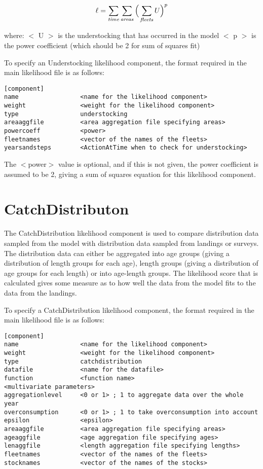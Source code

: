 \documentclass [a4paper, 10pt]{book}
\begin{document}
\begin{equation}\label{eq:understocking}
\ell = \sum_{\it time}\sum_{\it areas} \Big(\sum_{\it fleets} U \Big)^p
\end{equation}

where:\newline
$<$ U $>$ is the understocking that has occurred in the model\newline
$<$ p $>$ is the power coefficient (which should be 2 for sum of squares fit)

\bigskip
To specify an Understocking likelihood component, the format required in the main likelihood file is as follows:

{\small\begin{verbatim}
[component]
name                 <name for the likelihood component>
weight               <weight for the likelihood component>
type                 understocking
areaaggfile          <area aggregation file specifying areas>
powercoeff           <power>
fleetnames           <vector of the names of the fleets>
yearsandsteps        <ActionAtTime when to check for understocking>
\end{verbatim}}

The $<$power$>$ value is optional, and if this is not given, the power coefficient is assumed to be 2, giving a sum of squares equation for this likelihood component.

\section{CatchDistributon}\label{sec:catchdist}
The CatchDistribution likelihood component is used to compare distribution data sampled from the model with distribution data sampled from landings or surveys.  The distribution data can either be aggregated into age groups (giving a distribution of length groups for each age), length groups (giving a distribution of age groups for each length) or into age-length groups.  The likelihood score that is calculated gives some measure as to how well the data from the model fits to the data from the landings.

\bigskip
To specify a CatchDistribution likelihood component, the format required in the main likelihood file is as follows:

{\small\begin{verbatim}
[component]
name                 <name for the likelihood component>
weight               <weight for the likelihood component>
type                 catchdistribution
datafile             <name for the datafile>
function             <function name>
<multivariate parameters>
aggregationlevel     <0 or 1> ; 1 to aggregate data over the whole year
overconsumption      <0 or 1> ; 1 to take overconsumption into account
epsilon              <epsilon>
areaaggfile          <area aggregation file specifying areas>
ageaggfile           <age aggregation file specifying ages>
lenaggfile           <length aggregation file specifying lengths>
fleetnames           <vector of the names of the fleets>
stocknames           <vector of the names of the stocks>
\end{verbatim}}
\end{document}
